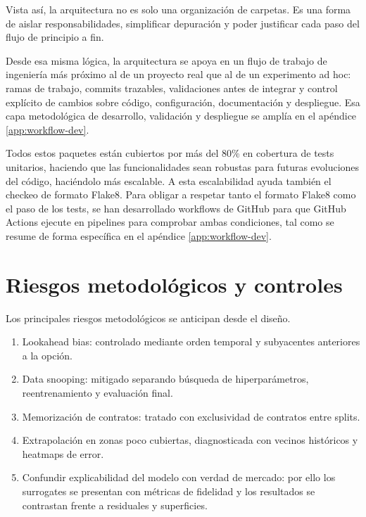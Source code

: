 Vista así, la arquitectura no es solo una organización de carpetas. Es una forma de aislar responsabilidades, simplificar depuración y poder justificar cada paso del flujo de principio a fin.

Desde esa misma lógica, la arquitectura se apoya en un flujo de trabajo de ingeniería más próximo al de un proyecto real que al de un experimento ad hoc: ramas de trabajo, commits trazables, validaciones antes de integrar y control explícito de cambios sobre código, configuración, documentación y despliegue. Esa capa metodológica de desarrollo, validación y despliegue se amplía en el apéndice \ref{app:workflow-dev}.

Todos estos paquetes están cubiertos por más del 80\% en cobertura de tests unitarios, haciendo que las funcionalidades sean robustas para futuras evoluciones del código, haciéndolo más escalable. A esta escalabilidad ayuda también el checkeo de formato Flake8. Para obligar a respetar tanto el formato Flake8 como el paso de los tests, se han desarrollado workflows de GitHub para que GitHub Actions ejecute en pipelines para comprobar ambas condiciones, tal como se resume de forma específica en el apéndice \ref{app:workflow-dev}.


\section{Riesgos metodológicos y controles}
\label{sec:riesgos}

Los principales riesgos metodológicos se anticipan desde el diseño. 

\begin{enumerate}
    \item Lookahead bias: controlado mediante orden temporal y subyacentes anteriores a la opción.
    \item Data snooping: mitigado separando búsqueda de hiperparámetros, reentrenamiento y evaluación final.
    \item Memorización de contratos: tratado con exclusividad de contratos entre splits.
    \item Extrapolación en zonas poco cubiertas, diagnosticada con vecinos históricos y heatmaps de error. 
    \item Confundir explicabilidad del modelo con verdad de mercado: por ello los surrogates se presentan con métricas de fidelidad y los resultados se contrastan frente a residuales y superficies.
\end{enumerate}
